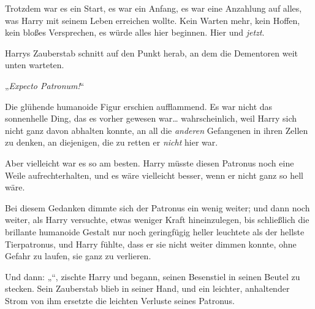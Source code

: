 Trotzdem war es ein Start, es war ein Anfang, es war eine Anzahlung auf alles, was Harry mit seinem Leben erreichen wollte. Kein Warten mehr, kein Hoffen, kein bloßes Versprechen, es würde alles hier beginnen. Hier und \emph{jetzt}.

Harrys Zauberstab schnitt auf den Punkt herab, an dem die Dementoren weit unten warteten.

„\emph{Expecto Patronum!}“

Die glühende humanoide Figur erschien aufflammend. Es war nicht das sonnenhelle Ding, das es vorher gewesen war… wahrscheinlich, weil Harry sich nicht ganz davon abhalten konnte, an all die \emph{anderen} Gefangenen in ihren Zellen zu denken, an diejenigen, die zu retten er \emph{nicht} hier war.

Aber vielleicht war es so am besten. Harry müsste diesen Patronus noch eine Weile aufrechterhalten, und es wäre vielleicht besser, wenn er nicht ganz so hell wäre.

Bei diesem Gedanken dimmte sich der Patronus ein wenig weiter; und dann noch weiter, als Harry versuchte, etwas weniger Kraft hineinzulegen, bis schließlich die brillante humanoide Gestalt nur noch geringfügig heller leuchtete als der hellste Tierpatronus, und Harry fühlte, dass er sie nicht weiter dimmen konnte, ohne Gefahr zu laufen, sie ganz zu verlieren.

Und dann: „“, zischte Harry und begann, seinen Besenstiel in seinen Beutel zu stecken. Sein Zauberstab blieb in seiner Hand, und ein leichter, anhaltender Strom von ihm ersetzte die leichten Verluste seines Patronus.

